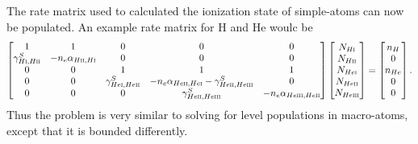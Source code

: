 The rate matrix used to calculated the ionization state of simple-atoms
can now be populated. An example rate matrix for H and He woulc be
\begin{equation}
\begin{bmatrix}
    1  & 1 & 0 & 0 & 0 \\
    \gamma_{H\textsc{i},H\textsc{ii}}^S & -n_e \alpha_{H\textsc{ii},H\textsc{i}} & 0 & 0 & 0 \\
     0 & 0 & 1 & 1 & 1 \\
     0 & 0 & \gamma_{He\textsc{i},He\textsc{ii}}^S & -n_e \alpha_{He\textsc{ii},He\textsc{i}} - \gamma_{He\textsc{ii},He\textsc{iii}}^S & 0\\
     0 & 0 & 0 & \gamma_{He\textsc{ii},He\textsc{iii}}^S & -n_e \alpha_{He\textsc{iii},He\textsc{ii}}
\end{bmatrix}
\begin{bmatrix}
    N_{H\textsc{i}} \\
    N_{H\textsc{ii}} \\
    N_{He\textsc{i}} \\
    N_{He\textsc{ii}} \\
    N_{He\textsc{iii}} 
\end{bmatrix}
=
\begin{bmatrix}
    n_H \\
    0 \\
    n_{He} \\  
    0 \\
    0
\end{bmatrix}
.
\end{equation}
Thus the problem is very similar to solving for level populations in macro-atoms, except that
it is bounded differently.


